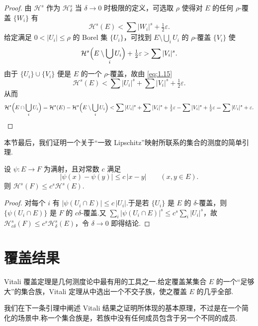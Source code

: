 \begin{proof}
由 $\mathcal{H}^s$ 作为 $\mathcal{H}^s_{\delta}$ 当 $\delta\to 0$ 时极限的定义，可选取 $\rho$ 使得对 $E$ 的任何 $\rho$-覆盖 $\{W_i\}$ 有
\begin{equation}\label{eq:1.15}
  \mathcal{H}^{s}(E)<\sum|W_i|^{s}+\tfrac{1}{2}\varepsilon.
\end{equation}
给定满足 $0<|U_i|\leq\rho$ 的 Borel 集 $\{U_i\}$，可找到 $E\setminus\bigcup_{i}U_i$ 的 $\rho$-覆盖 $\{V_i\}$ 使
\[
  \mathcal{H}^{s}\Bigl(E\setminus\bigcup_{i}U_i\Bigr)+\tfrac{1}{2}\varepsilon>\sum|V_i|^{s}.
\]
由于 $\{U_i\}\cup\{V_i\}$ 便是 $E$ 的一个 $\rho$-覆盖，故由 \eqref{eq:1.15}
\[
  \mathcal{H}^{s}(E)<\sum|U_i|^{s}+\sum|V_i|^{s}+\tfrac{1}{2}\varepsilon.
\]
从而
\[
  \mathcal{H}^{s}\Bigl(E\cap\bigcup_{i}U_i\Bigr)
  =\mathcal{H}^{s}(E)-\mathcal{H}^{s}\Bigl(E\setminus\bigcup_{i}U_i\Bigr)
  <\sum|U_i|^{s}+\sum|V_i|^{s}+\tfrac{1}{2}\varepsilon-\sum|V_i|^{s}+\tfrac{1}{2}\varepsilon
  =\sum|U_i|^{s}+\varepsilon. \qedhere
\]
\end{proof}

本节最后，我们证明一个关于``一致 Lipschitz''映射所联系的集合的测度的简单引理.

\begin{lemma}\label{lem:1.8}
设 $\psi:E\to F$ 为满射，且对常数 $c$ 满足
\[
  |\psi(x)-\psi(y)|\leq c\,|x-y|\qquad(x,y\in E).
\]
则 $\mathcal{H}^s(F)\leq c^s\mathcal{H}^s(E)$.
\end{lemma}

\begin{proof}
对每个 $i$ 有 $|\psi(U_i\cap E)|\leq c\,|U_i|$.于是若 $\{U_i\}$ 是 $E$ 的 $\delta$-覆盖，则 $\{\psi(U_i\cap E)\}$ 是 $F$ 的 $c\delta$-覆盖.又 $\sum_{i}|\psi(U_i\cap E)|^s\leq c^s\sum_{i}|U_i|^s$，故 $\mathcal{H}^s_{c\delta}(F)\leq c^s\mathcal{H}^s_{\delta}(E)$，令 $\delta\to 0$ 即得结论.
\end{proof}

\section{覆盖结果}

Vitali 覆盖定理是几何测度论中最有用的工具之一.给定覆盖某集合 $E$ 的一个``足够大''的集合族，Vitali 定理从中选出一个不交子族，使之覆盖 $E$ 的几乎全部.

我们在下一条引理中阐述 Vitali 结果之证明所体现的基本原理，不过是在一个简化的场景中.称一个集合族是，若族中没有任何成员包含于另一个不同的成员.

